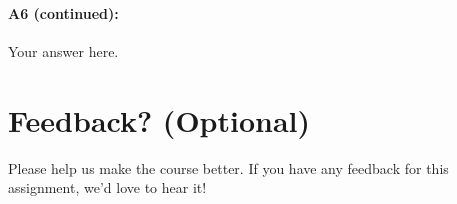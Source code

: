 \pagebreak
\paragraph{A6 (continued):} Your answer here.







\pagebreak
\section*{Feedback? (Optional)}
Please help us make the course better. If you have any feedback for this assignment, we'd love to hear it!




